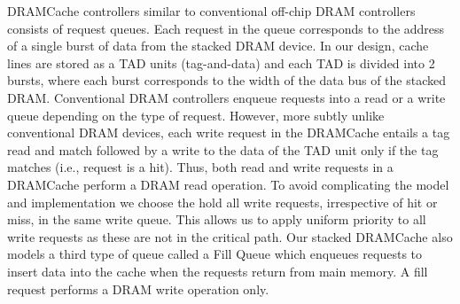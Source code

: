 \par DRAMCache controllers similar to conventional off-chip DRAM controllers consists of request queues. Each request in the queue corresponds to the address of a single burst of data from the stacked DRAM device.
In our design, cache lines are stored as a TAD units (tag-and-data) \cite{alloy} and each TAD is divided into 2 bursts, where each burst corresponds to the width of the data bus of the stacked DRAM.
Conventional DRAM controllers enqueue requests into a read or a write queue depending on the type of request. 
However, more subtly unlike conventional DRAM devices, each write request in the DRAMCache entails a tag read and match followed by a write to the data of the TAD unit only if the tag matches (i.e., request is a hit). Thus, both read and write requests in a DRAMCache perform a DRAM read operation. To avoid complicating the model and implementation we choose the hold all write requests, irrespective of hit or miss, in the same write queue. This allows us to apply uniform priority to all write requests as these are not in the critical path.
Our stacked DRAMCache also models a third type of queue called a Fill Queue \cite{dca} which enqueues requests to insert data into the cache when the requests return from main memory. A fill request performs a DRAM write operation only. 

